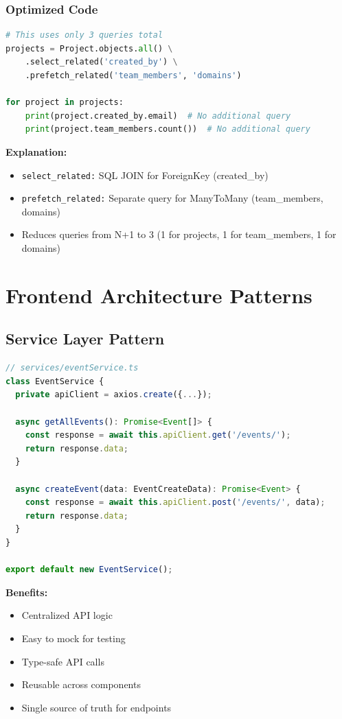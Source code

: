 \documentclass[11pt,a4paper]{article}
\begin{document}
\subsubsection{Optimized Code}
\begin{lstlisting}[language=Python]
# This uses only 3 queries total
projects = Project.objects.all() \
    .select_related('created_by') \
    .prefetch_related('team_members', 'domains')

for project in projects:
    print(project.created_by.email)  # No additional query
    print(project.team_members.count())  # No additional query
\end{lstlisting}

\textbf{Explanation:}
\begin{itemize}[leftmargin=*]
    \item \texttt{select\_related:} SQL JOIN for ForeignKey (created\_by)
    \item \texttt{prefetch\_related:} Separate query for ManyToMany (team\_members, domains)
    \item Reduces queries from N+1 to 3 (1 for projects, 1 for team\_members, 1 for domains)
\end{itemize}

\section{Frontend Architecture Patterns}

\subsection{Service Layer Pattern}
\begin{lstlisting}[language=TypeScript]
// services/eventService.ts
class EventService {
  private apiClient = axios.create({...});
  
  async getAllEvents(): Promise<Event[]> {
    const response = await this.apiClient.get('/events/');
    return response.data;
  }
  
  async createEvent(data: EventCreateData): Promise<Event> {
    const response = await this.apiClient.post('/events/', data);
    return response.data;
  }
}

export default new EventService();
\end{lstlisting}

\textbf{Benefits:}
\begin{itemize}[leftmargin=*]
    \item Centralized API logic
    \item Easy to mock for testing
    \item Type-safe API calls
    \item Reusable across components
    \item Single source of truth for endpoints
\end{itemize}
\end{document}
